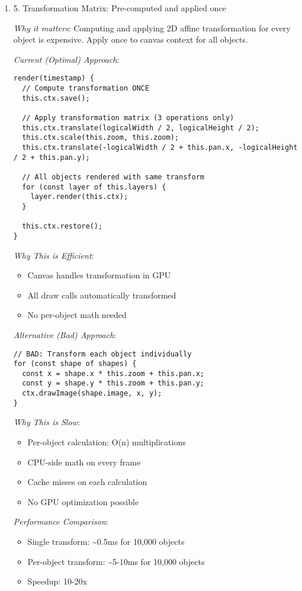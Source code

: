 \documentclass[11pt]{article}
\begin{document}
\begin{enumerate}
\begin{enumerate}
\noindent\rule{\textwidth}{0.5pt}
\item 5. Transformation Matrix: Pre-computed and applied once
\label{sec:org81f8ece}

\emph{Why it matters}: Computing and applying 2D affine transformation for every object is expensive. Apply once to canvas context for all objects.

\emph{Current (Optimal) Approach}:
\begin{verbatim}
render(timestamp) {
  // Compute transformation ONCE
  this.ctx.save();
  
  // Apply transformation matrix (3 operations only)
  this.ctx.translate(logicalWidth / 2, logicalHeight / 2);
  this.ctx.scale(this.zoom, this.zoom);
  this.ctx.translate(-logicalWidth / 2 + this.pan.x, -logicalHeight / 2 + this.pan.y);
  
  // All objects rendered with same transform
  for (const layer of this.layers) {
    layer.render(this.ctx);
  }
  
  this.ctx.restore();
}
\end{verbatim}

\emph{Why This is Efficient}:
\begin{itemize}
\item Canvas handles transformation in GPU
\item All draw calls automatically transformed
\item No per-object math needed
\end{itemize}

\emph{Alternative (Bad) Approach}:
\begin{verbatim}
// BAD: Transform each object individually
for (const shape of shapes) {
  const x = shape.x * this.zoom + this.pan.x;
  const y = shape.y * this.zoom + this.pan.y;
  ctx.drawImage(shape.image, x, y);
}
\end{verbatim}

\emph{Why This is Slow}:
\begin{itemize}
\item Per-object calculation: O(n) multiplications
\item CPU-side math on every frame
\item Cache misses on each calculation
\item No GPU optimization possible
\end{itemize}

\emph{Performance Comparison}:
\begin{itemize}
\item Single transform: \textasciitilde{}0.5ms for 10,000 objects
\item Per-object transform: \textasciitilde{}5-10ms for 10,000 objects
\item Speedup: 10-20x
\end{itemize}


\end{enumerate}
\end{enumerate}
\end{document}
